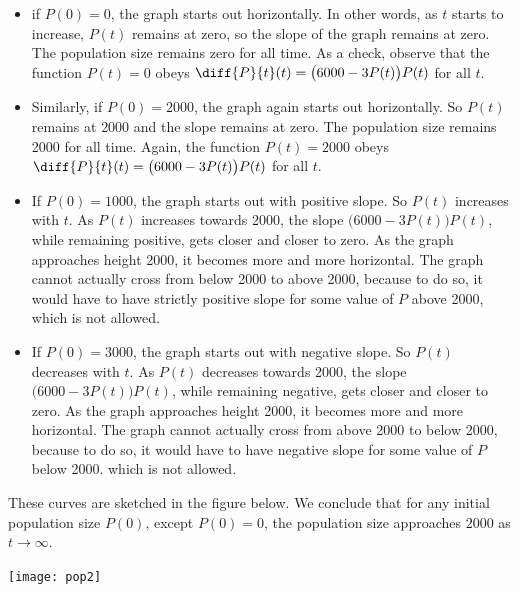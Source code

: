 \begin{itemize}
  \item  if $P(0)=0$, the graph starts out horizontally. In other
    words, as $t$ starts to increase, $P(t)$ remains at zero, so the slope
    of the graph remains at zero. The population
    size remains zero for all time. As a check, observe that
    the function $P(t)=0$ obeys $\diff{P}{t}(t)=\big(6000-3P(t)\big)P(t)$
    for all $t$.

  \item  Similarly, if $P(0)=2000$, the graph again starts out
    horizontally. So $P(t)$ remains at $2000$ and the slope remains at zero.
    The population size remains 2000 for all time. Again, the function
    $P(t)=2000$ obeys $\diff{P}{t}(t)=\big(6000-3P(t)\big)P(t)$ for all $t$.

  \item  If $P(0)=1000$, the graph starts out with positive slope.
    So $P(t)$ increases with $t$. As $P(t)$ increases towards 2000, the slope
    $(6000-3P(t)\big)P(t)$, while remaining positive, gets closer and closer
    to zero. As the graph approaches height 2000, it becomes more and more
    horizontal. The graph cannot actually cross from below 2000 to above 2000,
    because to do so, it would have to have strictly positive slope for
    some value of $P$ above 2000, which is not allowed.

  \item  If $P(0)=3000$, the graph starts out with negative slope.
    So $P(t)$ decreases with $t$. As $P(t)$ decreases towards 2000, the slope
    $(6000-3P(t)\big)P(t)$, while remaining negative, gets closer and closer
    to zero. As the graph approaches height 2000, it becomes more and more
    horizontal. The graph cannot actually cross from above 2000 to below 2000,
    because to do so, it would have to have negative slope for some value of
    $P$ below 2000. which is not allowed.
\end{itemize}

\noindent These curves are sketched in the figure below. We conclude that
for any initial population size $P(0)$, except $P(0)=0$, the population
size approaches $2000$ as $t\rightarrow\infty$.

\begin{fig}
\begin{center}
   \texttt{[image: pop2]}
\end{center}
\end{fig}

